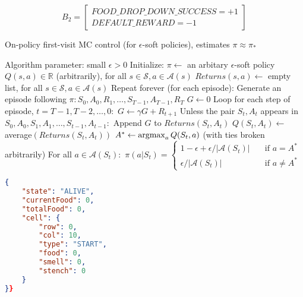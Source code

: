 \begin{equation}
    B_{2} =  \begin{bmatrix} 
        FOOD\_DROP\_DOWN\_SUCCESS = +1\\
        DEFAULT\_REWARD = -1          
 \end{bmatrix}
\end{equation}



\begin{algorithm}
    \caption{On-policy first-visit MC control (for $\epsilon$-soft policies), estimates $\pi \approx \pi_*$}
    \begin{algorithmic}[1]
        \State Algorithm parameter: small $\epsilon > 0$
        \State Initialize:
        \Indent
           \State $\pi \gets$ an arbitary $\epsilon$-soft policy
           \State $Q(s,a) \in \mathbb{R}$ (arbitrarily), for all $s \in \mathcal{S}, a \in \mathcal{A}(s)$
           \State $Returns(s,a) \gets$ empty list, for all $s \in \mathcal{S}, a \in \mathcal{A}(s)$
        \EndIndent
        \State Repeat forever (for each episode):
        \Indent
            \State Generate an episode following $\pi: S_0, A_0, R_1, \dots, S_{T-1}, A_{T-1}, R_T$
            \State $G \gets 0$
            \State Loop for each step of episode, $t= T-1,T-2, \dots, 0:$
            \Indent
                \State $G \gets \gamma G + R_{t+1}$
                \State Unless the pair $S_t, A_t$ appears in $S_0, A_0, S_1, A_1, \dots ,S_{t-1}, A_{t-1}:$
                \Indent
                    \State Append $G$ to $Returns(S_t,A_t)$
                    \State $Q(S_t,A_t) \gets$ average$(Returns(S_t,A_t))$
                    \State $A^* \gets \operatorname*{argmax}_a Q(S_t, a)$ (with ties broken arbitrarily)
                    \State For all $a \in \mathcal{A}(S_t):$
                    \Indent
                     \State  $\pi(a|S_t) =   
                        \begin{cases}
                            1-\epsilon + \epsilon / |\mathcal{A}(S_t)|      & \quad \text{if } a = A^* \\
                            \epsilon / |\mathcal{A}(S_t)|  & \quad \text{if } a \neq A^*
                        \end{cases}$
                    \EndIndent
                \EndIndent
            \EndIndent
        \EndIndent 
    \end{algorithmic}
\end{algorithm}


\begin{lstlisting}[language=json,firstnumber=1, label=lst:ursprüngliche Wahrnehmung,caption=Wahrnehmung des Agenten bei dem ursprünglichen Problem]
{
    "state": "ALIVE",
    "currentFood": 0,
    "totalFood": 0,
    "cell": {
        "row": 0,
        "col": 10,
        "type": "START",
        "food": 0,
        "smell": 0,
        "stench": 0
    }
}}
\end{lstlisting}